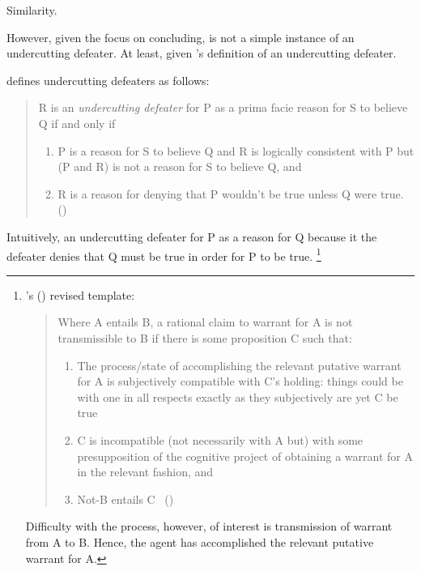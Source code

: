 \begin{note}
  Similarity.

  However, given the focus on concluding, \curb{} is not a simple instance of an undercutting defeater.
  At least, given \citeauthor{Pollock:1987un}'s definition of an undercutting defeater.

  \citeauthor{Pollock:1987un} defines undercutting defeaters as follows:
  \begin{quote}
    R is an \emph{undercutting defeater} for P as a prima facie reason for S to believe Q if and only if
    \begin{enumerate}[label=(UD\arabic*), ref=(UD\arabic*)]
    \item
      \label{pollock:ud:1}
      P is a reason for S to believe Q and R is logically consistent with P but (P and R) is not a reason for S to believe Q, and
    \item
      \label{pollock:ud:2}
      R is a reason for denying that P wouldn't be true unless Q were true.%
      \mbox{}\hfill\mbox{(\citeyear[485]{Pollock:1987un})}
    \end{enumerate}
  \end{quote}
  Intuitively, an undercutting defeater for P as a reason for Q because it the defeater denies that Q must be true in order for P to be true.%
  \footnote{
    \citeauthor{Wright:2011wn}'s (\citeyear{Wright:2011wn}) revised template:
    \begin{quote}
      Where A entails B, a rational claim to warrant for A is not transmissible to B if there is some proposition C such that:
      \begin{enumerate}[label=(\roman*), noitemsep]
      \item
        The process/state of accomplishing the relevant putative warrant for A is subjectively compatible with C’s holding: things could be with one in all respects exactly as they subjectively are yet C be true
      \item
        C is incompatible (not necessarily with A but) with some presupposition of the cognitive project of obtaining a warrant for A in the relevant fashion, and
      \item
        Not-B entails C%
      \mbox{ }\hfill\mbox{(\citeyear[93]{Wright:2011wn})}
      \end{enumerate}
    \end{quote}
    Difficulty with the process, however, of interest is transmission of warrant from A to B.
    Hence, the agent has accomplished the relevant putative warrant for A.

}
\end{note}
